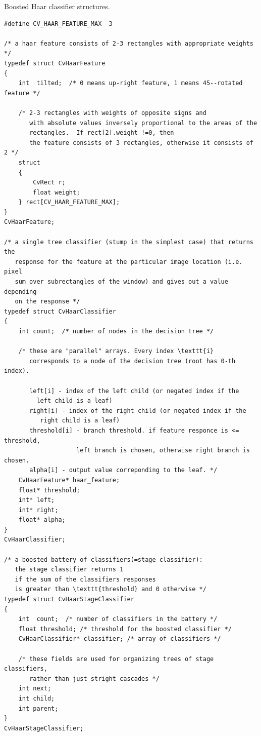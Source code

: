 Boosted Haar classifier structures.

\begin{lstlisting}
#define CV_HAAR_FEATURE_MAX  3

/* a haar feature consists of 2-3 rectangles with appropriate weights */
typedef struct CvHaarFeature
{
    int  tilted;  /* 0 means up-right feature, 1 means 45--rotated feature */

    /* 2-3 rectangles with weights of opposite signs and
       with absolute values inversely proportional to the areas of the 
       rectangles.  If rect[2].weight !=0, then
       the feature consists of 3 rectangles, otherwise it consists of 2 */
    struct
    {
        CvRect r;
        float weight;
    } rect[CV_HAAR_FEATURE_MAX];
}
CvHaarFeature;

/* a single tree classifier (stump in the simplest case) that returns the 
   response for the feature at the particular image location (i.e. pixel 
   sum over subrectangles of the window) and gives out a value depending 
   on the response */
typedef struct CvHaarClassifier
{
    int count;  /* number of nodes in the decision tree */

    /* these are "parallel" arrays. Every index \texttt{i}
       corresponds to a node of the decision tree (root has 0-th index).

       left[i] - index of the left child (or negated index if the 
         left child is a leaf)
       right[i] - index of the right child (or negated index if the 
          right child is a leaf)
       threshold[i] - branch threshold. if feature responce is <= threshold, 
                    left branch is chosen, otherwise right branch is chosen.
       alpha[i] - output value correponding to the leaf. */
    CvHaarFeature* haar_feature;
    float* threshold;
    int* left;
    int* right;
    float* alpha;
}
CvHaarClassifier;

/* a boosted battery of classifiers(=stage classifier):
   the stage classifier returns 1
   if the sum of the classifiers responses
   is greater than \texttt{threshold} and 0 otherwise */
typedef struct CvHaarStageClassifier
{
    int  count;  /* number of classifiers in the battery */
    float threshold; /* threshold for the boosted classifier */
    CvHaarClassifier* classifier; /* array of classifiers */

    /* these fields are used for organizing trees of stage classifiers,
       rather than just stright cascades */
    int next;
    int child;
    int parent;
}
CvHaarStageClassifier;


\end{lstlisting}
